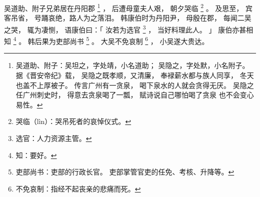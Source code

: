 
\switchcolumn*[\section{}]

吴道助、附子兄弟居在丹阳郡%
\footnote{%
    吴道助、附子：吴坦之，字处靖，小名道助；
                  吴隐之，字处默，小名附子。
                  据《晋安帝纪》载，
                  吴隐之既孝顺，又清廉，
                  奉䘵薪水都与族人同享，
                  冬天也盖不上厚被子。
                  传言广州有一贪泉，
                  喝下泉水的人就会贪得无厌。
                  吴隐之任广州刺史时，
                  得意去贪泉喝了一瓢，
                  赋诗说自己哪怕喝了贪泉
                  也不会变心易性。
}%
，
后遭母童夫人艰，
朝夕哭临%
\footnote{%
    哭临（lìn）：哭吊死者的哀悼仪式。
}%
。
及思至，
宾客吊省，
号踊哀绝，路人为之落泪。
韩康伯时为丹阳尹，
母殷在郡，
每闻二吴之哭，
辄为凄恻，
语康伯曰：「
    汝若为选官%
    \footnote{%
        选官：人力资源主管。
    }%
    ，
    当好料理此人。
」
康伯亦甚相知%
\footnote{%
    知：要好。
}%
。
韩后果为吏部尚书%
\footnote{%
    吏部尚书：吏部的行政长官。
              吏部掌管官吏的任免、考核、升降等。
}%
。
大吴不免哀制%
\footnote{%
    不免哀制：指经不起丧亲的悲痛而死。
}%
，
小吴遂大贵达。

\switchcolumn


